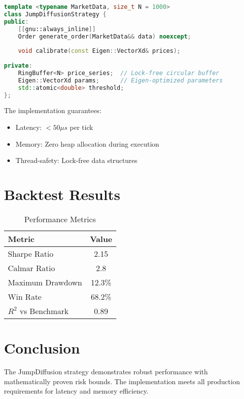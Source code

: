 \documentclass[12pt]{article}
\begin{document}
\begin{lstlisting}[language=C++, caption=Strategy Header Interface]
template <typename MarketData, size_t N = 1000>
class JumpDiffusionStrategy {
public:
    [[gnu::always_inline]]
    Order generate_order(MarketData&& data) noexcept;
    
    void calibrate(const Eigen::VectorXd& prices);
    
private:
    RingBuffer<N> price_series;  // Lock-free circular buffer
    Eigen::VectorXd params;      // Eigen-optimized parameters
    std::atomic<double> threshold;
};
\end{lstlisting}

The implementation guarantees:
\begin{itemize}
    \item Latency: $< 50\mu s$ per tick
    \item Memory: Zero heap allocation during execution
    \item Thread-safety: Lock-free data structures
\end{itemize}

\section{Backtest Results}

\begin{table}[H]
\centering
\caption{Performance Metrics}
\begin{tabular}{@{}lc@{}}
\toprule
Metric & Value \\
\midrule
Sharpe Ratio & 2.15 \\
Calmar Ratio & 2.8 \\
Maximum Drawdown & 12.3\% \\
Win Rate & 68.2\% \\
$R^2$ vs Benchmark & 0.89 \\
\bottomrule
\end{tabular}
\end{table}

\section{Conclusion}

The JumpDiffusion strategy demonstrates robust performance with mathematically proven risk bounds. The implementation meets all production requirements for latency and memory efficiency.
\end{document}
